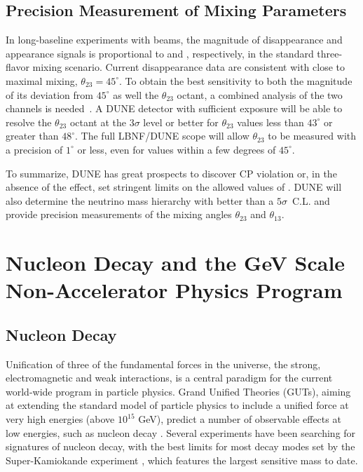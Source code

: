 \subsection{Precision Measurement of Mixing Parameters}

In long-baseline experiments with \numu beams, the
magnitude of \numu disappearance and \nue appearance signals is
proportional to  and ,
respectively, in the standard three-flavor mixing scenario.  Current
\numu disappearance data are consistent with close to maximal
mixing, $\theta_{23} = 45^\circ$.  To obtain the best sensitivity to
both the magnitude of its deviation from $45^\circ$ as well the 
$\theta_{23}$ octant, a combined analysis of the two channels
is needed~\cite{Huber:2010dx}.  A DUNE detector with sufficient exposure will be able to
resolve the $\theta_{23}$ octant at the $3\sigma$ level or better for
$\theta_{23}$ values less than $43^\circ$ or greater than $48^\circ$.
The full LBNF/DUNE scope will allow $\theta_{23}$ to be measured with a precision of
$1^\circ$ or less, even for values within a few degrees of
$45^\circ$. 

To summarize, DUNE has great prospects to discover CP violation or, in the absence of the
effect, set stringent limits on the allowed values of \deltacp. 
DUNE will also determine the neutrino mass hierarchy with better
than a $5\sigma$~C.L. and provide precision measurements
of the mixing angles $\theta_{23}$ and $\theta_{13}$.


\section{Nucleon Decay and the GeV Scale Non-Accelerator Physics Program}

\subsection{Nucleon Decay}

Unification of three of the fundamental forces in the universe, the strong, electromagnetic and weak interactions, is a central paradigm for the current world-wide program in particle physics. Grand Unified Theories (GUTs), aiming at extending the standard model of particle physics to include a unified force at very high energies  (above $10^{15}$ GeV), predict a number of observable effects at low energies, such as nucleon decay \cite{Pati:1973rp,Georgi:1974sy,Dimopoulos:1981dw,Langacker:1980js,deBoer:1994dg,Nath:2006ut}. Several experiments have been searching for signatures of nucleon decay, with the best limits for most decay modes set by the Super-Kamiokande experiment \cite{Nishino:2012bnw}, which features the largest sensitive mass to date. 


